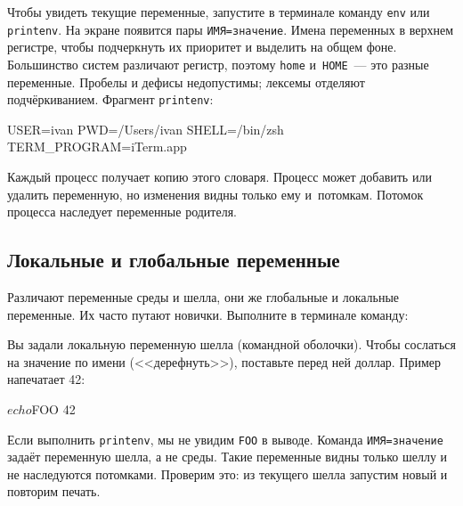 
Чтобы увидеть текущие переменные, запустите в терминале команду \verb|env| или
\verb|printenv|. На экране появится пары \verb|ИМЯ=значение|. Имена переменных в
верхнем регистре, чтобы подчеркнуть их приоритет и выделить на общем
фоне. Большинство систем различают регистр, поэтому \verb|home|
и~\verb|HOME|~--- это разные переменные. Пробелы и дефисы недопустимы; лексемы
отделяют подчёркиванием. Фрагмент \verb|printenv|:

\begin{english}
  \begin{bash}
USER=ivan
PWD=/Users/ivan
SHELL=/bin/zsh
TERM_PROGRAM=iTerm.app
  \end{bash}
\end{english}

Каждый процесс получает копию этого словаря. Процесс может добавить или удалить
переменную, но изменения видны только ему и~потомкам. Потомок процесса наследует
переменные родителя.

\subsection{Локальные и глобальные переменные}


Различают переменные среды и шелла, они же глобальные и локальные переменные. Их
часто путают новички. Выполните в терминале команду:

\begin{english}
\end{english}

Вы задали локальную переменную шелла (командной оболочки). Чтобы сослаться на
значение по имени (<<дерефнуть>>), поставьте перед ней доллар. Пример напечатает
42:

\begin{english}
  \begin{bash}
$ echo $FOO
42
  \end{bash}
\end{english}


Если выполнить \verb|printenv|, мы не увидим \verb|FOO| в выводе. Команда
\verb|ИМЯ=значение| задаёт переменную шелла, а не среды. Такие переменные видны
только шеллу и не наследуются потомками. Проверим это: из текущего шелла
запустим новый и повторим печать.

